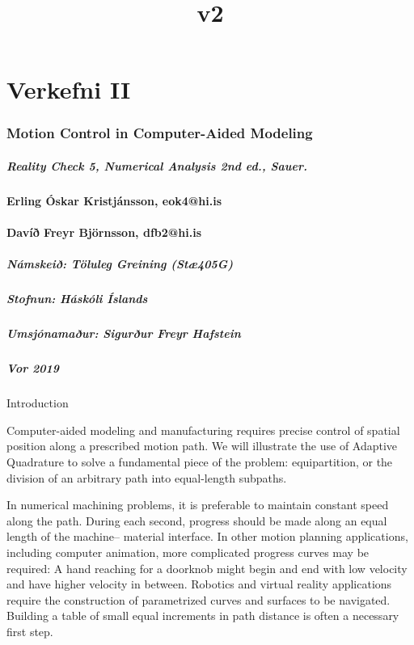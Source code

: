 \documentclass[11pt]{article}
\title{v2}
\begin{document}
    
    
    \maketitle
    
    

    
    

    \section{Verkefni II}\label{verkefni-ii}

\subsubsection{Motion Control in Computer-Aided
Modeling}\label{motion-control-in-computer-aided-modeling}

\subparagraph{Reality Check 5, Numerical Analysis 2nd ed.,
Sauer.}\label{reality-check-5-numerical-analysis-2nd-ed.-sauer.}

\paragraph{Erling Óskar Kristjánsson,
eok4@hi.is}\label{erling-uxf3skar-kristjuxe1nsson-eok4hi.is}

\paragraph{Davíð Freyr Björnsson,
dfb2@hi.is}\label{davuxeduxf0-freyr-bjuxf6rnsson-dfb2hi.is}

\subparagraph{Námskeið: Töluleg Greining
(Stæ405G)}\label{nuxe1mskeiuxf0-tuxf6luleg-greining-stuxe6405g}

\subparagraph{Stofnun: Háskóli
Íslands}\label{stofnun-huxe1skuxf3li-uxedslands}

\subparagraph{Umsjónamaður: Sigurður Freyr
Hafstein}\label{umsjuxf3namauxf0ur-siguruxf0ur-freyr-hafstein}

\subparagraph{Vor 2019}\label{vor-2019}

    Introduction

Computer-aided modeling and manufacturing requires precise control of
spatial position along a prescribed motion path. We will illustrate the
use of Adaptive Quadrature to solve a fundamental piece of the problem:
equipartition, or the division of an arbitrary path into equal-length
subpaths.

In numerical machining problems, it is preferable to maintain constant
speed along the path. During each second, progress should be made along
an equal length of the machine-- material interface. In other motion
planning applications, including computer animation, more complicated
progress curves may be required: A hand reaching for a doorknob might
begin and end with low velocity and have higher velocity in between.
Robotics and virtual reality applications require the construction of
parametrized curves and surfaces to be navigated. Building a table of
small equal increments in path distance is often a necessary first step.
\end{document}
